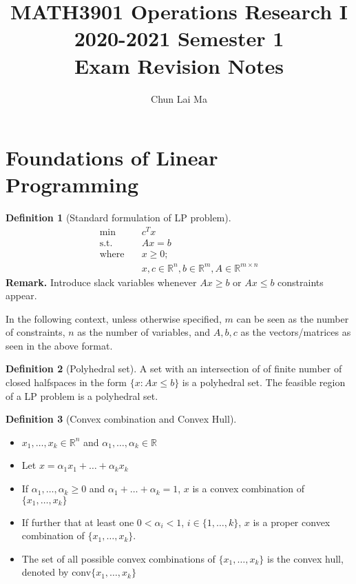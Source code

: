 \documentclass{article}
\title{MATH3901 Operations Research I\\
				2020-2021 Semester 1\\
                Exam Revision Notes}
\author{Chun Lai Ma}
\theoremstyle{definition}
\newtheorem{definition}{Definition}[section]
\begin{document}
	\maketitle

	\tableofcontents
	\break

	\section{Foundations of Linear Programming}
	\begin{definition}[Standard formulation of LP problem]\hfill
		\begin{align*}	
			\text{min} \quad& c^T x \\
			\text{s.t.} \quad& Ax = b \\
			\text{where} \quad& x \geq 0;\\
			&x, c \in \mathbb{R}^n, b \in \mathbb{R}^m, A \in \mathbb{R}^{m\times n}
		\end{align*}
		\textbf{Remark.} Introduce slack variables whenever $Ax \geq b$ or $Ax \leq b$ constraints appear.
	\end{definition}

	\noindent In the following context, unless otherwise specified, $m$ can be seen as the number of constraints, $n$ as the number of variables, and $A, b, c$ as the vectors/matrices as seen in the above format.

	\begin{definition}[Polyhedral set]\hfill\break
		A set with an intersection of of finite number of closed halfspaces in the form $\{x : Ax \leq b\}$ is a polyhedral set.
		The feasible region of a LP problem is a polyhedral set.
	\end{definition}

	\begin{definition}[Convex combination and Convex Hull]\hfill
		\begin{itemize}
			\item $x_1, \dots, x_k \in \mathbb{R}^n$ and $\alpha_1, \dots, \alpha_k \in \mathbb{R}$
			\item Let $x = \alpha_1x_1+\dots+\alpha_kx_k$
			\item If $\alpha_1, \dots, \alpha_k \geq 0$ and $\alpha_1+\dots+\alpha_k = 1$, $x$ is a convex combination of $\{x_1, \dots, x_k\}$
			\item If further that at least one $0 < \alpha_i < 1$, $i \in \{1,\dots,k\}$, $x$ is a proper convex combination of $\{x_1, \dots, x_k\}$.
			\item The set of all possible convex combinations of $\{x_1, \dots, x_k\}$ is the convex hull, denoted by conv$\{x_1, \dots, x_k\}$
		\end{itemize}
	\end{definition}
\end{document}
